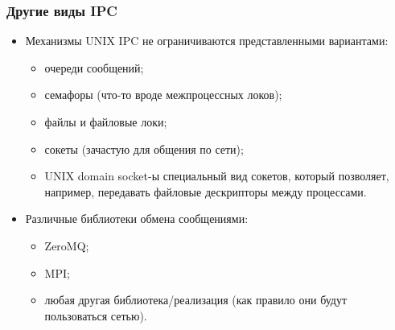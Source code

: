 \begin{frame}
\frametitle{Другие виды IPC}
\begin{itemize}
  \item Механизмы UNIX IPC не ограничиваются представленными вариантами:
  \begin{itemize}
    \item очереди сообщений;
    \item семафоры (что-то вроде межпроцессных локов);
    \item файлы и файловые локи;
    \item сокеты (зачастую для общения по сети);
    \item UNIX domain socket-ы специальный вид сокетов, который позволяет,
    например, передавать файловые дескрипторы между процессами.
  \end{itemize}
  \item Различные библиотеки обмена сообщениями:
  \begin{itemize}
    \item ZeroMQ;
    \item MPI;
    \item любая другая библиотека/реализация (как правило они будут пользоваться
    сетью).
  \end{itemize}
\end{itemize}
\end{frame}
